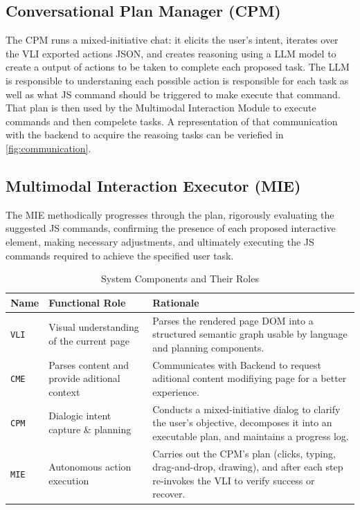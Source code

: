 \documentclass[conference]{IEEEtran}
\begin{document}
\subsection{Conversational Plan Manager (CPM)}

The CPM runs a mixed‑initiative chat: it elicits the user's intent, iterates over the VLI exported actions JSON, and creates reasoning using a LLM model to create a output of actions to be taken to complete each proposed task. The LLM is responsible to understaning each possible action is responsible for each task as well as what JS command should be triggered to make execute that command. That plan is then used by the Multimodal Interaction Module to execute commands and then compelete tasks. A representation of that communication with the backend to acquire the reasoing tasks can be veriefied in \autoref{fig:communication}.

\subsection{Multimodal Interaction Executor (MIE)}

The MIE methodically progresses through the plan, rigorously evaluating the suggested JS commands, confirming the presence of each proposed interactive element, making necessary adjustments, and ultimately executing the JS commands required to achieve the specified user task.

\begin{table}[h]
\centering
\caption{System Components and Their Roles}
\label{tab:architecture}
\small
\renewcommand{\arraystretch}{1.3}
\begin{tabular}{|>{\raggedright\arraybackslash}p{0.8cm}|>{\raggedright\arraybackslash}p{2.5cm}|>{\raggedright\arraybackslash}p{4cm}|}
\hline
\textbf{Name} & \textbf{Functional Role} & \textbf{Rationale} \\
\hline
\texttt{VLI} & Visual understanding of the current page & Parses the rendered page DOM into a structured semantic graph usable by language and planning components. \\
\hline
\texttt{CME} & Parses content and provide aditional context & Communicates with Backend to request aditional content modifiying page for a better experience. \\
\hline
\texttt{CPM} & Dialogic intent capture \& planning & Conducts a mixed-initiative dialog to clarify the user's objective, decomposes it into an executable plan, and maintains a progress log. \\
\hline
\texttt{MIE} & Autonomous action execution & Carries out the CPM's plan (clicks, typing, drag-and-drop, drawing), and after each step re-invokes the VLI to verify success or recover. \\
\hline
\end{tabular}
\end{table}
\end{document}
